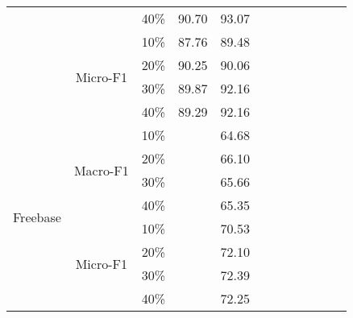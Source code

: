 \begin{table*}[!htbp]
\begin{tabular}{|c|c|c||c|c|c|c|c||c|c|c|c|}
                          &                           & 40\%     &  90.70   &   93.07      &     &     &     &        &        &        &        \\ \cline{2-12} 
                          & \multirow{4}{*}{Micro-F1} & 10\%     &  87.76   &   89.48      &     &     &     &        &        &        &        \\
                          &                           & 20\%     &  90.25   &   90.06      &     &     &     &        &        &        &        \\
                          &                           & 30\%     &  89.87   &   92.16      &     &     &     &        &        &        &        \\
                          &                           & 40\%     &  89.29   &   92.16      &     &     &     &        &        &        &        \\ \hline
\multirow{8}{*}{Freebase} & \multirow{4}{*}{Macro-F1} & 10\%     &          &   64.68      &     &     &     &        &        &        &        \\
                          &                           & 20\%     &          &   66.10      &     &     &     &        &        &        &        \\
                          &                           & 30\%     &          &   65.66      &     &     &     &        &        &        &        \\
                          &                           & 40\%     &          &   65.35      &     &     &     &        &        &        &        \\ \cline{2-12} 
                          & \multirow{4}{*}{Micro-F1} & 10\%     &          &   70.53      &     &     &     &        &        &        &        \\
                          &                           & 20\%     &          &   72.10      &     &     &     &        &        &        &        \\
                          &                           & 30\%     &          &   72.39      &     &     &     &        &        &        &        \\
                          &                           & 40\%     &          &   72.25      &     &     &     &        &        &        &        \\ \hline
\end{tabular}
\end{table*}

